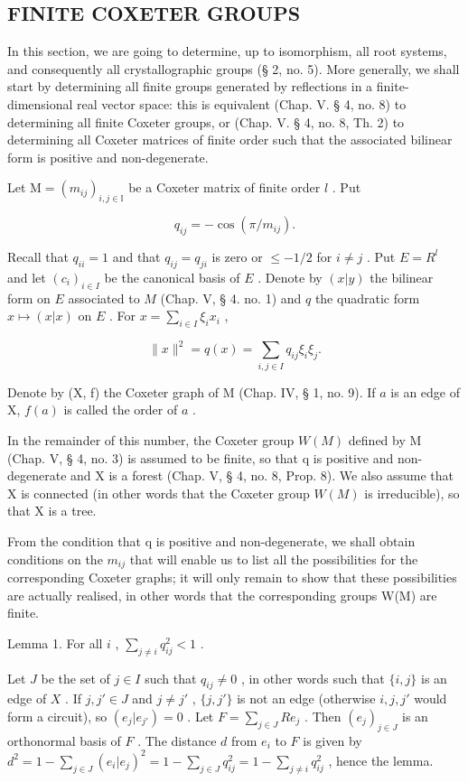 \subsection{FINITE COXETER GROUPS}

In this section, we are going to determine, up to isomorphism, all root systems, and consequently all crystallographic groups (§ 2, no. 5). More generally, we shall start by determining all finite groups generated by reflections in a finite-dimensional real vector space: this is equivalent (Chap. V. § 4, no. 8) to determining all finite Coxeter groups, or (Chap. V. § 4, no. 8, Th. 2) to determining all Coxeter matrices of finite order such that the associated bilinear form is positive and non-degenerate.

Let \(\mathrm{M} = (m_{ij})_{i,j\in \mathbb{I}}\) be a Coxeter matrix of finite order \(l\) . Put

\[
q _ {i j} = - \cos (\pi / m _ {i j}).
\]

Recall that \(q_{ii} = 1\) and that \(q_{ij} = q_{ji}\) is zero or \(\leqslant -1/2\) for \(i \neq j\) . Put \(E = R^l\) and let \((c_i)_{i \in I}\) be the canonical basis of \(E\) . Denote by \((x|y)\) the bilinear form on \(E\) associated to \(M\) (Chap. V, § 4. no. 1) and \(q\) the quadratic form \(x \mapsto (x|x)\) on \(E\) . For \(x = \sum_{i \in I} \xi_i x_i\) ,

\[
\| x \| ^ {2} = q (x) = \sum_ {i, j \in I} q _ {i j} \xi_ {i} \xi_ {j}.
\]

Denote by (X, f) the Coxeter graph of M (Chap. IV, § 1, no. 9). If \(a\) is an edge of X, \(f(a)\) is called the order of \(a\) .

In the remainder of this number, the Coxeter group \(W(M)\) defined by M (Chap. V, § 4, no. 3) is assumed to be finite, so that q is positive and non-degenerate and X is a forest (Chap. V, § 4, no. 8, Prop. 8). We also assume that X is connected (in other words that the Coxeter group \(W(M)\) is irreducible), so that X is a tree.

From the condition that q is positive and non-degenerate, we shall obtain conditions on the \(m_{ij}\) that will enable us to list all the possibilities for the corresponding Coxeter graphs; it will only remain to show that these possibilities are actually realised, in other words that the corresponding groups W(M) are finite.

Lemma 1. For all \(i\) , \(\sum_{j \neq i} q_{ij}^2 < 1\) .

Let \(J\) be the set of \(j \in I\) such that \(q_{ij} \neq 0\) , in other words such that \(\{i, j\}\) is an edge of \(X\) . If \(j, j' \in J\) and \(j \neq j'\) , \(\{j, j'\}\) is not an edge (otherwise \(i, j, j'\) would form a circuit), so \((e_j | e_{j'}) = 0\) . Let \(F = \sum_{j \in J} R e_j\) . Then \((e_j)_{j \in J}\) is an orthonormal basis of \(F\) . The distance \(d\) from \(e_i\) to \(F\) is given by \(d^2 = 1 - \sum_{j \in J} (e_i | e_j)^2 = 1 - \sum_{j \in J} q_{ij}^2 = 1 - \sum_{j \neq i} q_{ij}^2\) , hence the lemma.

